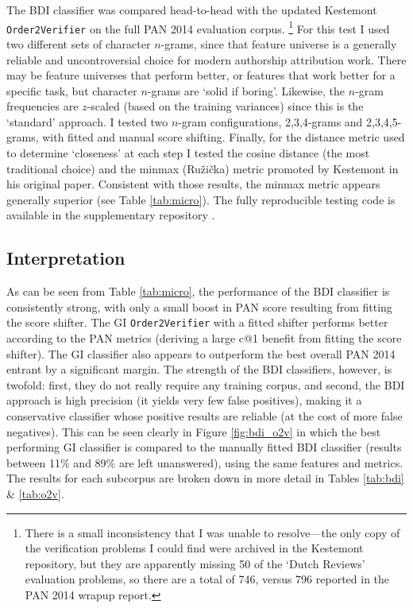 \documentclass[
    hf
]{ceurart}
\begin{document}
The BDI classifier was compared head-to-head with the updated Kestemont
\texttt{Order2Verifier} on the full PAN 2014 evaluation corpus.%
%
\footnote{ There is a small inconsistency that I was unable to resolve---the
    only copy of the verification problems I could find were archived in the
    Kestemont repository, but they are apparently missing 50 of the `Dutch
    Reviews' evaluation problems, so there are a total of 746, versus 796
    reported in the PAN 2014 wrapup report. }
%
For this test I used two different sets of character $n$-grams, since that
feature universe is a generally reliable and uncontroversial choice for modern
authorship attribution work. There may be feature universes that perform better,
or features that work better for a specific task, but character $n$-grams are
`solid if boring'. Likewise, the $n$-gram frequencies are $z$-scaled (based on
the training variances) since this is the `standard' approach. I tested two
$n$-gram configurations, 2,3,4-grams and 2,3,4,5-grams, with fitted and manual
score shifting. Finally, for the distance metric used to determine `closeness'
at each step I tested the cosine distance (the most traditional choice) and the
minmax (Ružička) metric promoted by Kestemont in his original paper. Consistent
with those results, the minmax metric appears generally superior (see Table
\ref{tab:micro}). The fully reproducible testing code is available in the
supplementary repository \cite{nagy_bdi_2024}.

\subsection{Interpretation}

As can be seen from Table \ref{tab:micro}, the performance of the BDI classifier
is consistently strong, with only a small boost in PAN score resulting from
fitting the score shifter. The GI \texttt{Order2Verifier} with a fitted shifter
performs better according to the PAN metrics (deriving a large c@1 benefit from
fitting the score shifter). The GI classifier also appears to outperform the
best overall PAN 2014 entrant by a significant margin. The strength of the BDI
classifiers, however, is twofold: first, they do not really require any training
corpus, and second, the BDI approach is high precision (it yields very few false
positives), making it a conservative classifier whose positive results are
reliable (at the cost of more false negatives). This can be seen clearly in
Figure \ref{fig:bdi_o2v} in which the best performing GI classifier is compared
to the manually fitted BDI classifier (results between 11\% and 89\% are left
unanswered), using the same features and metrics. The results for each subcorpus
are broken down in more detail in Tables \ref{tab:bdi} \& \ref{tab:o2v}.
\end{document}
